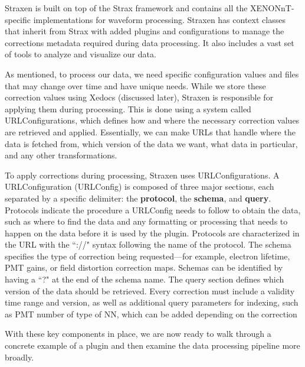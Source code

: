Straxen is built on top of the Strax framework and contains all the XENONnT-specific implementations for waveform processing. Straxen has context classes that inherit from Strax with added plugins and configurations to manage the corrections metadata required during data processing. It also includes a vast set of tools to analyze and visualize our data. 

As mentioned, to process our data, we need specific configuration values and files that may change over time and have unique needs. While we store these correction values using Xedocs (discussed later), Straxen is responsible for applying them during processing. This is done using a system called URLConfigurations, which defines how and where the necessary correction values are retrieved and applied. Essentially, we can make URLs that handle where the data is fetched from, which version of the data we want, what data in particular, and any other transformations.

To apply corrections during processing, Straxen uses URLConfigurations. A URLConfiguration (URLConfig) is composed of three major sections, each separated by a specific delimiter: the \textbf{protocol}, the \textbf{schema}, and \textbf{query}. Protocols indicate the procedure a URLConfig needs to follow to obtain the data, such as where to find the data and any formatting or processing that needs to happen on the data before it is used by the plugin. Protocols are characterized in the URL with the ``://" syntax following the name of the protocol. The schema specifies the type of correction being requested—for example, electron lifetime, PMT gains, or field distortion correction maps. Schemas can be identified by having a ``?" at the end of the schema name. The query section defines which version of the data should be retrieved. Every correction must include a validity time range and version, as well as additional query parameters for indexing, such as PMT number of type of NN, which can be added depending on the correction

With these key components in place, we are now ready to walk through a concrete example of a plugin and then examine the data processing pipeline more broadly.%

